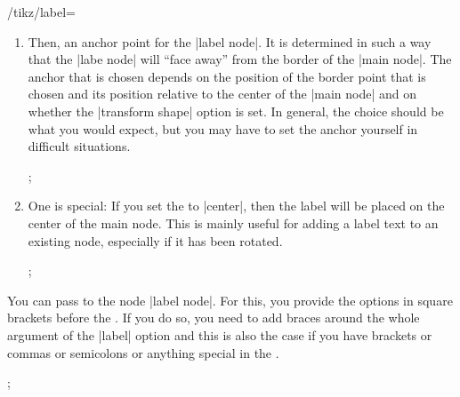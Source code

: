 \begin{key}{/tikz/label=}
\begin{enumerate}
\begin{key}{/tikz/absolute= (default true)}
      The difference can be seen in the following example:
\begin{codeexample}[]
\tikz [rotate=-80,every label/.style={draw,red}]
  ;
\end{codeexample}
\begin{codeexample}[]
\tikz [rotate=-80,every label/.style={draw,red},absolute]
  ;
\end{codeexample}
    \end{key}
  \item Then, an anchor point for the |label node|. It is determined
    in such a way that the |labe node| will ``face away'' from the
    border of the |main node|. The anchor that is chosen depends on
    the position of the border point that is chosen and its position
    relative to the center of the |main node| and on whether the
    |transform shape| option is set. In general, the choice should be
    what you would expect, but you may have to set the anchor yourself
    in difficult situations.
\begin{codeexample}[]
\tikz
  ;
\end{codeexample}
  \item
    One  is special: If you set the  to
    |center|, then the label will be placed on the center of the main
    node. This is mainly useful for adding a label text to an existing
    node, especially if it has been rotated.
\begin{codeexample}[]
\tikz {};
\end{codeexample}
  \end{enumerate}

  You can pass  to the node |label node|. For this, you
  provide the options in square brackets before the . If you
  do so, you need to add braces around the whole argument of the
  |label| option and this is also the case if you have brackets or
  commas or semicolons or anything special in the .
\begin{codeexample}[]
\tikz {};
\end{codeexample}

\begin{codeexample}[]
\end{codeexample}


\end{key}
